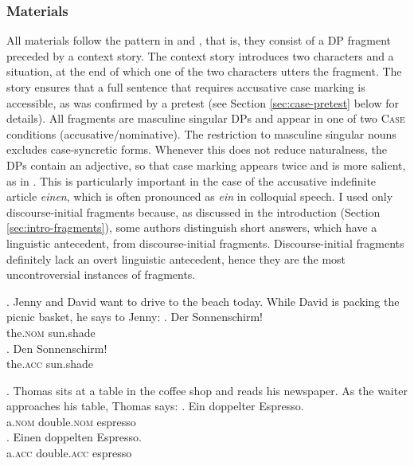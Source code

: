 \subsubsection{Materials}
\label{sec:case-materials}
All materials follow the pattern in \Next and \NNext, that is, they consist of a DP fragment preceded by a context story. The context story introduces two characters and a situation, at the end of which one of the two characters utters the fragment. The story ensures that a full sentence that requires accusative case marking is accessible, as was confirmed by a pretest (see Section \ref{sec:case-pretest} below for details). All fragments are masculine singular DPs and appear in one of two \textsc{Case} conditions (accusative/nominative). The restriction to masculine singular nouns excludes case-syncretic forms. Whenever this does not reduce naturalness, the DPs contain an adjective, so that case marking appears twice and is more salient, as in \NNext. This is particularly important in the case of the accusative indefinite article \textit{einen}, which is often pronounced as \textit{ein} in colloquial speech. I used only discourse-initial fragments because, as discussed in the introduction (Section \ref{sec:intro-fragments}), some authors \citep[e.g.][]{klein1993, reich2011} distinguish short answers, which have a linguistic antecedent, from discourse-initial fragments. Discourse-initial fragments definitely lack an overt linguistic antecedent, hence they are the most uncontroversial instances of fragments.

\ex. Jenny and David want to drive to the beach today. While David is packing the picnic basket, he says to Jenny: 
\ag. Der Sonnenschirm!\\ 
the.\textsc{nom} sun.shade\\
\bg. Den Sonnenschirm!\\
the.\textsc{acc} sun.shade\\

\ex. Thomas sits at a table in the coffee shop and reads his newspaper. As the waiter approaches his table, Thomas says:\label{ex:fragments-item-xplease}
\ag. Ein doppelter Espresso.\\
a.\textsc{nom} double.\textsc{nom} espresso\\
 
\bg. Einen doppelten Espresso.\\
a.\textsc{acc} double.\textsc{acc} espresso\\
 

